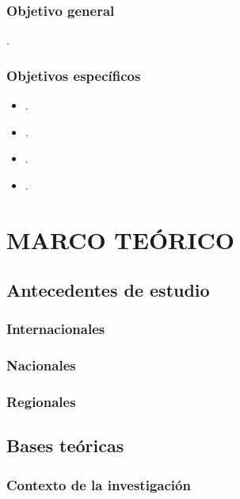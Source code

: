 \documentclass[12pt,a4paper]{article}
\begin{document}
\subsubsection{Objetivo general}
\objetivo.
\subsubsection{Objetivos específicos}
\begin{itemize}
	\item \objetivoe.
	\item \objetivoee.
	\item \objetivoeee.
	\item \objetivoeeee.
\end{itemize}


\section{MARCO TEÓRICO}

\subsection{Antecedentes de estudio}
\subsubsection{Internacionales}


\subsubsection{Nacionales}

\subsubsection{Regionales}

\subsection{Bases teóricas}
\subsubsection{Contexto de la investigación}

\subsubsection{\variablei}%
\end{document}

